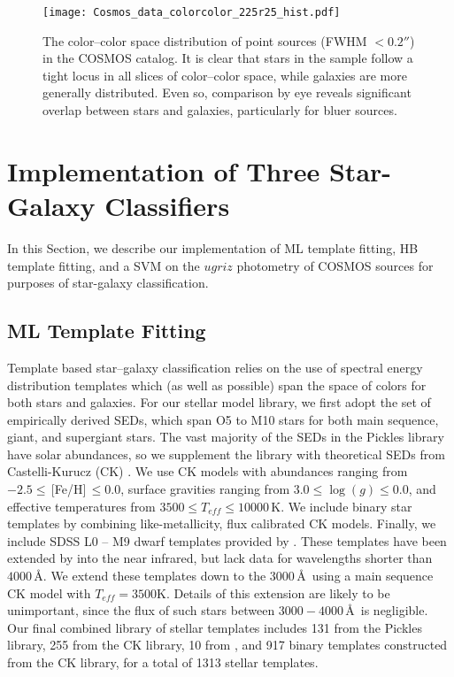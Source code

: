 \documentclass[12pt,preprint]{aastex}
\begin{document}
\begin{figure}
\centering
\texttt{[image: Cosmos\_data\_colorcolor\_225r25\_hist.pdf]}
\caption{The color--color space distribution of point sources (FWHM $<
  0.2''$) in the COSMOS catalog.  It is clear that stars in the sample
  follow a tight locus in all slices of color--color space, while
  galaxies are more generally distributed.  Even so, comparison by eye
  reveals significant overlap between stars and galaxies, particularly
  for bluer sources.}
\label{fig:color-color-data}
\end{figure}


\section{Implementation of Three Star-Galaxy Classifiers}
\label{sec:specifics}

In this Section, we describe our implementation of ML template
fitting, HB template fitting, and a SVM on the $ugriz$ photometry of
COSMOS sources for purposes of star-galaxy classification.

\subsection{ML Template Fitting}
\label{ssec:MLspecifics}

Template based star--galaxy classification relies on the use of
spectral energy distribution templates which (as well as possible)
span the space of colors for both stars and galaxies.  For our stellar
model library, we first adopt the \citet{pickles98} set of empirically
derived SEDs, which span O5 to M10 stars for both main sequence,
giant, and supergiant stars.  The vast majority of the SEDs in the
Pickles library have solar abundances, so we supplement the library
with theoretical SEDs from Castelli-Kurucz (CK) \citep{castelli04a}.
We use CK models with abundances ranging from $-2.5
\le\,$[Fe/H]$\,\le0.0$, surface gravities ranging from
$3.0\le\log(g)\le0.0$, and effective temperatures from $3500 \le
T_{eff} \le 10000\,$K.  We include binary star templates by combining
like-metallicity, flux calibrated CK models.  Finally, we include SDSS
L0 -- M9 dwarf templates provided by \citet{bochanski07}.  These
templates have been extended by \citeauthor{bochanski07} into the near
infrared, but lack data for wavelengths shorter than $4000\,$\AA.  We
extend these templates down to the $3000\,$\AA\, using a main sequence
CK model with $T_{eff}=3500$K.  Details of this extension are likely
to be unimportant, since the flux of such stars between
$3000-4000\,$\AA\, is negligible.  Our final combined library of stellar
templates includes 131 from the Pickles library, 255 from the CK library,
10 from \citet{bochanski07}, and 917 binary templates constructed from
the CK library, for a total of 1313 stellar templates.
\end{document}
